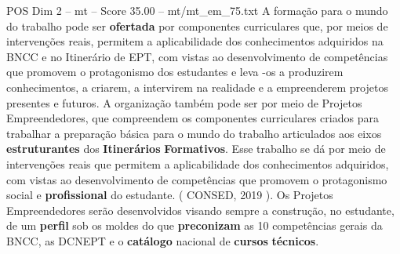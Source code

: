 \begin{textsample}{POS Dim 2 – mt – Score 35.00 – mt/mt\_em\_75.txt}
A formação para o mundo do trabalho pode ser \textbf{ofertada} por componentes curriculares que, por meios de intervenções reais, permitem a aplicabilidade dos conhecimentos adquiridos na BNCC e no Itinerário de EPT, com vistas ao desenvolvimento de competências que promovem o protagonismo dos estudantes e leva -os a produzirem conhecimentos, a criarem, a intervirem na realidade e a empreenderem projetos presentes e futuros.
A organização também pode ser por meio de Projetos Empreendedores, que compreendem os componentes curriculares criados para trabalhar a preparação básica para o mundo do trabalho articulados aos eixos \textbf{estruturantes} dos \textbf{Itinerários} \textbf{Formativos}.
Esse trabalho se dá por meio de intervenções reais que permitem a aplicabilidade dos conhecimentos adquiridos, com vistas ao desenvolvimento de competências que promovem o protagonismo social e \textbf{profissional} do estudante. ( CONSED, 2019 ).
Os Projetos Empreendedores serão desenvolvidos visando sempre a construção, no estudante, de um \textbf{perfil} sob os moldes do que \textbf{preconizam} as 10 competências gerais da BNCC, as DCNEPT e o \textbf{catálogo} nacional de \textbf{cursos} \textbf{técnicos}.

\end{textsample}
